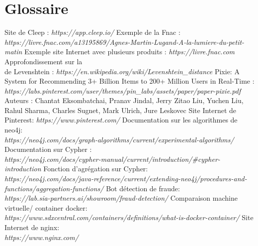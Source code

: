 \documentclass{article} %
\begin{document}
\section{Glossaire}
\begin{thebibliography}{9}
 Site de Cleep : \textit{https://app.cleep.io/}
 Exemple de la Fnac : \textit{https://livre.fnac.com/a13195869/Agnes-Martin-Lugand-A-la-lumiere-du-petit-matin}
 Exemple site Internet avec plusieurs produits : \textit{https://livre.fnac.com}
 Approfondissement sur la \\
  de Levenshtein : \textit{https://en.wikipedia.org/wiki/Levenshtein\_distance}
 Pixie: A System for Recommending 3+ Billion Items to 200+ Million Users in Real-Time :
 \textit{https://labs.pinterest.com/user/themes/pin\_labs/assets/paper/paper-pixie.pdf}\\
 Auteurs : Chantat Eksombatchai, Pranav Jindal, Jerry Zitao Liu, Yuchen Liu,
 Rahul Sharma, Charles Sugnet, Mark Ulrich, Jure Leskovec
 Site Internet de Pinterest: \textit{https://www.pinterest.com/}
 Documentation sur les algorithmes de neo4j: \\ \textit{https://neo4j.com/docs/graph-algorithms/current/experimental-algorithms/}
 Documentation sur Cypher :\\
 \textit{https://neo4j.com/docs/cypher-manual/current/introduction/\#cypher-introduction}
 Fonction d'agrégation sur Cypher:\\
 \textit{https://neo4j.com/docs/java-reference/current/extending-neo4j/procedures-and-functions/aggregation-functions/}
 Bot détection de fraude:\\
 \textit{https://lab.sia-partners.ai/showroom/fraud-detection/}
 Comparaison machine virtuelle/ container docker:\\
 \textit{https://www.sdxcentral.com/containers/definitions/what-is-docker-container/}
 Site Internet de nginx:\\
 \textit{https://www.nginx.com/}
 
\end{thebibliography}
\newpage






\imtaMakeCover
\end{document}
